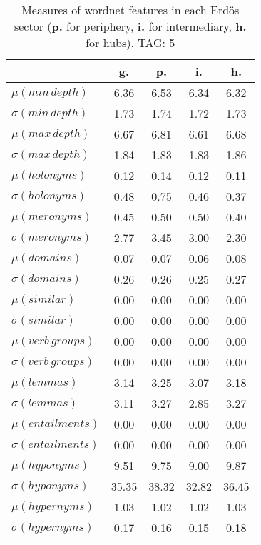 \begin{table}[h!]
\begin{center}
\begin{tabular}{| l | c | c | c | c |}\hline
 & g. & p. & i. & h. \\\hline
$\mu(min\,depth)$ & 6.36  & 6.53  & 6.34  & 6.32 \\\hline
$\sigma(min\,depth)$ & 1.73  & 1.74  & 1.72  & 1.73 \\\hline
$\mu(max\,depth)$ & 6.67  & 6.81  & 6.61  & 6.68 \\\hline
$\sigma(max\,depth)$ & 1.84  & 1.83  & 1.83  & 1.86 \\\hline
$\mu(holonyms)$ & 0.12  & 0.14  & 0.12  & 0.11 \\\hline
$\sigma(holonyms)$ & 0.48  & 0.75  & 0.46  & 0.37 \\\hline
$\mu(meronyms)$ & 0.45  & 0.50  & 0.50  & 0.40 \\\hline
$\sigma(meronyms)$ & 2.77  & 3.45  & 3.00  & 2.30 \\\hline
$\mu(domains)$ & 0.07  & 0.07  & 0.06  & 0.08 \\\hline
$\sigma(domains)$ & 0.26  & 0.26  & 0.25  & 0.27 \\\hline
$\mu(similar)$ & 0.00  & 0.00  & 0.00  & 0.00 \\\hline
$\sigma(similar)$ & 0.00  & 0.00  & 0.00  & 0.00 \\\hline
$\mu(verb\,groups)$ & 0.00  & 0.00  & 0.00  & 0.00 \\\hline
$\sigma(verb\,groups)$ & 0.00  & 0.00  & 0.00  & 0.00 \\\hline
$\mu(lemmas)$ & 3.14  & 3.25  & 3.07  & 3.18 \\\hline
$\sigma(lemmas)$ & 3.11  & 3.27  & 2.85  & 3.27 \\\hline
$\mu(entailments)$ & 0.00  & 0.00  & 0.00  & 0.00 \\\hline
$\sigma(entailments)$ & 0.00  & 0.00  & 0.00  & 0.00 \\\hline
$\mu(hyponyms)$ & 9.51  & 9.75  & 9.00  & 9.87 \\\hline
$\sigma(hyponyms)$ & 35.35  & 38.32  & 32.82  & 36.45 \\\hline
$\mu(hypernyms)$ & 1.03  & 1.02  & 1.02  & 1.03 \\\hline
$\sigma(hypernyms)$ & 0.17  & 0.16  & 0.15  & 0.18 \\\hline
\end{tabular}
\caption{Measures of wordnet features in each Erd\"os sector ({{\bf p.}} for periphery, {{\bf i.}} for intermediary, {{\bf h.}} for hubs). TAG: 5}
\end{center}
\end{table}